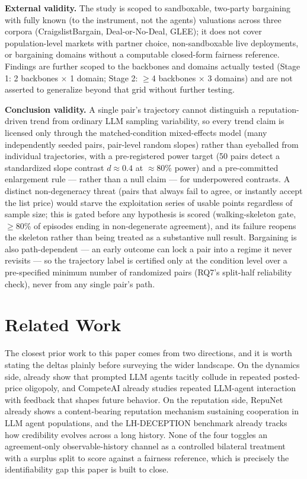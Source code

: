 \documentclass[11pt]{article}
\begin{document}
\textbf{External validity.} The study is scoped to sandboxable, two-party bargaining with fully known (to the instrument, not the agents) valuations across three corpora (CraigslistBargain, Deal-or-No-Deal, GLEE); it does not cover population-level markets with partner choice, non-sandboxable live deployments, or bargaining domains without a computable closed-form fairness reference. Findings are further scoped to the backbones and domains actually tested (Stage 1: 2 backbones $\times$ 1 domain; Stage 2: $\geq$4 backbones $\times$ 3 domains) and are not asserted to generalize beyond that grid without further testing.

\textbf{Conclusion validity.} A single pair's trajectory cannot distinguish a reputation-driven trend from ordinary LLM sampling variability, so every trend claim is licensed only through the matched-condition mixed-effects model (many independently seeded pairs, pair-level random slopes) rather than eyeballed from individual trajectories, with a pre-registered power target (50 pairs detect a standardized slope contrast $d \approx 0.4$ at $\approx$80\% power) and a pre-committed enlargement rule --- rather than a null claim --- for underpowered contrasts. A distinct non-degeneracy threat (pairs that always fail to agree, or instantly accept the list price) would starve the exploitation series of usable points regardless of sample size; this is gated before any hypothesis is scored (walking-skeleton gate, $\geq$80\% of episodes ending in non-degenerate agreement), and its failure reopens the skeleton rather than being treated as a substantive null result. Bargaining is also path-dependent --- an early outcome can lock a pair into a regime it never revisits --- so the trajectory label is certified only at the condition level over a pre-specified minimum number of randomized pairs (RQ7's split-half reliability check), never from any single pair's path.

\section{Related Work}

The closest prior work to this paper comes from two directions, and it is worth stating the deltas plainly before surveying the wider landscape. On the dynamics side, \citet{fish2024algorithmic} already show that prompted LLM agents tacitly collude in repeated posted-price oligopoly, and CompeteAI \citep{competeai} already studies repeated LLM-agent interaction with feedback that shapes future behavior. On the reputation side, RepuNet \citep{repunet2505} already shows a content-bearing reputation mechanism sustaining cooperation in LLM agent populations, and the LH-DECEPTION benchmark \citep{lhdeception} already tracks how credibility evolves across a long history. None of the four toggles an agreement-only observable-history channel as a controlled bilateral treatment with a surplus split to score against a fairness reference, which is precisely the identifiability gap this paper is built to close.
\end{document}
